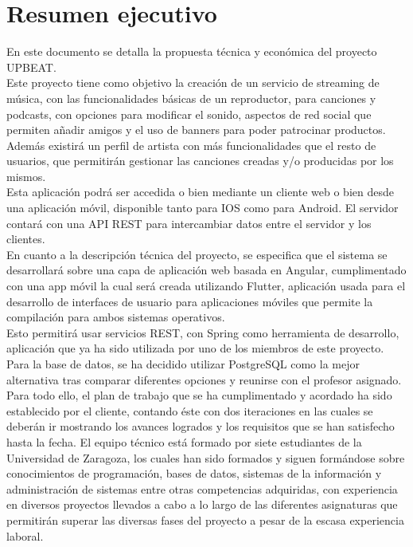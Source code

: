 \documentclass{article}
\begin{document}
\maketitle
\newpage
\section*{Resumen ejecutivo}
En este documento se detalla la propuesta técnica y económica del proyecto UPBEAT.\\  \hfill \break
Este proyecto tiene como objetivo la creación de un servicio de streaming de música, con las funcionalidades básicas de un reproductor, para canciones y podcasts, con opciones para modificar el sonido, aspectos de red social que permiten añadir amigos y el uso de banners para poder patrocinar productos. \\
Además existirá un perfil de artista con más funcionalidades que el resto de usuarios, que permitirán gestionar las canciones creadas y/o producidas por los mismos.\\

Esta aplicación podrá ser accedida o bien mediante un cliente web o bien desde una aplicación móvil, disponible tanto para IOS como para Android. El servidor contará con una API REST para intercambiar datos entre el servidor y los clientes.\\

En cuanto a la descripción técnica del proyecto, se especifica que el sistema se desarrollará sobre una capa de aplicación web basada en Angular, cumplimentado con una app móvil la cual será creada utilizando Flutter, aplicación usada para el desarrollo de interfaces de usuario para aplicaciones móviles que permite la compilación para ambos sistemas operativos.\\
Esto permitirá usar servicios REST, con Spring como herramienta de desarrollo, aplicación que ya ha sido utilizada por uno de los miembros de este proyecto. Para la base de datos, se ha decidido utilizar PostgreSQL como la mejor alternativa tras comparar diferentes opciones y reunirse con el profesor asignado. \\ 

Para todo ello, el plan de trabajo que se ha cumplimentado y acordado ha sido establecido por el cliente, contando éste con dos iteraciones en las cuales se deberán ir mostrando los avances logrados y los requisitos que se han satisfecho hasta la fecha.
El equipo técnico está formado por siete estudiantes de la Universidad de Zaragoza, los cuales han sido formados y siguen formándose sobre conocimientos de programación, bases de datos, sistemas de la información y administración de sistemas entre otras competencias adquiridas, con experiencia en diversos proyectos llevados a cabo a lo largo de las diferentes asignaturas que permitirán superar las diversas fases del proyecto a pesar de la escasa experiencia laboral.\\
\end{document}
